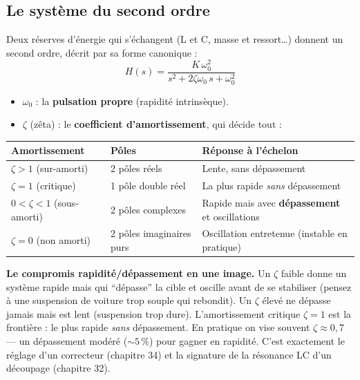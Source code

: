 \documentclass[12pt,a4paper,twoside]{book}
\begin{document}
\subsection{Le système du second ordre}

\begin{formule}
Deux réserves d'énergie qui s'échangent (L et C, masse et ressort\ldots) donnent un second ordre, décrit par sa forme canonique :
\[
H(s) = \frac{K\,\omega_0^2}{s^2 + 2\zeta\omega_0\,s + \omega_0^2}
\]
\begin{itemize}[nosep]
\item $\omega_0$ : la \textbf{pulsation propre} (rapidité intrinsèque).
\item $\zeta$ (zêta) : le \textbf{coefficient d'amortissement}, qui décide tout :
\end{itemize}
\begin{center}
\renewcommand{\arraystretch}{1.3}
\begin{tabular}{p{3.1cm}p{2.7cm}p{6.0cm}}
\toprule
\textbf{Amortissement} & \textbf{Pôles} & \textbf{Réponse à l'échelon} \\
\midrule
$\zeta > 1$ (sur-amorti) & 2 pôles réels & Lente, sans dépassement \\
$\zeta = 1$ (critique) & 1 pôle double réel & La plus rapide \textit{sans} dépassement \\
$0 < \zeta < 1$ (sous-amorti) & 2 pôles complexes & Rapide mais avec \textbf{dépassement} et oscillations \\
$\zeta = 0$ (non amorti) & 2 pôles imaginaires purs & Oscillation entretenue (instable en pratique) \\
\bottomrule
\end{tabular}
\end{center}
\end{formule}

\begin{intuition}
\textbf{Le compromis rapidité/dépassement en une image.} Un $\zeta$ faible donne un système rapide mais qui ``dépasse'' la cible et oscille avant de se stabiliser (pensez à une suspension de voiture trop souple qui rebondit). Un $\zeta$ élevé ne dépasse jamais mais est lent (suspension trop dure). L'amortissement critique $\zeta = 1$ est la frontière : le plus rapide \textit{sans} dépassement. En pratique on vise souvent $\zeta \approx 0{,}7$ --- un dépassement modéré ($\sim 5\,\%$) pour gagner en rapidité. C'est exactement le réglage d'un correcteur (chapitre 34) et la signature de la résonance LC d'un découpage (chapitre 32).
\end{intuition}
\end{document}
